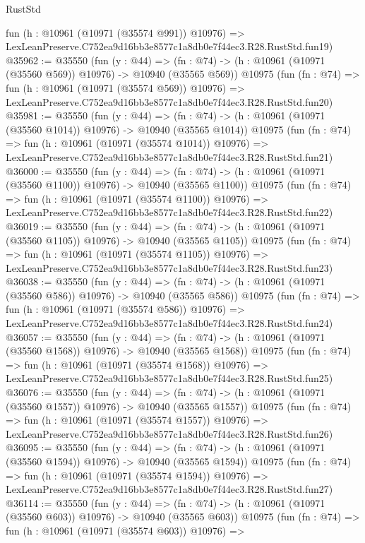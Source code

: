 \begin{lexlean}{RustStd}
\begin{coremodule}
    fun (h : @10961 (@10971 (@35574 @991)) @10976) =>
    LexLeanPreserve.C752ea9d16bb3e8577c1a8db0e7f44ec3.R28.RustStd.fun19)
@35962 := @35550
    (fun (y : @44) =>
    (fn : @74) -> (h : @10961 (@10971 (@35560 @569)) @10976) -> @10940 (@35565 @569))
    @10975
    (fun (fn : @74) =>
    fun (h : @10961 (@10971 (@35574 @569)) @10976) =>
    LexLeanPreserve.C752ea9d16bb3e8577c1a8db0e7f44ec3.R28.RustStd.fun20)
@35981 := @35550
    (fun (y : @44) =>
    (fn : @74) -> (h : @10961 (@10971 (@35560 @1014)) @10976) -> @10940 (@35565 @1014))
    @10975
    (fun (fn : @74) =>
    fun (h : @10961 (@10971 (@35574 @1014)) @10976) =>
    LexLeanPreserve.C752ea9d16bb3e8577c1a8db0e7f44ec3.R28.RustStd.fun21)
@36000 := @35550
    (fun (y : @44) =>
    (fn : @74) -> (h : @10961 (@10971 (@35560 @1100)) @10976) -> @10940 (@35565 @1100))
    @10975
    (fun (fn : @74) =>
    fun (h : @10961 (@10971 (@35574 @1100)) @10976) =>
    LexLeanPreserve.C752ea9d16bb3e8577c1a8db0e7f44ec3.R28.RustStd.fun22)
@36019 := @35550
    (fun (y : @44) =>
    (fn : @74) -> (h : @10961 (@10971 (@35560 @1105)) @10976) -> @10940 (@35565 @1105))
    @10975
    (fun (fn : @74) =>
    fun (h : @10961 (@10971 (@35574 @1105)) @10976) =>
    LexLeanPreserve.C752ea9d16bb3e8577c1a8db0e7f44ec3.R28.RustStd.fun23)
@36038 := @35550
    (fun (y : @44) =>
    (fn : @74) -> (h : @10961 (@10971 (@35560 @586)) @10976) -> @10940 (@35565 @586))
    @10975
    (fun (fn : @74) =>
    fun (h : @10961 (@10971 (@35574 @586)) @10976) =>
    LexLeanPreserve.C752ea9d16bb3e8577c1a8db0e7f44ec3.R28.RustStd.fun24)
@36057 := @35550
    (fun (y : @44) =>
    (fn : @74) -> (h : @10961 (@10971 (@35560 @1568)) @10976) -> @10940 (@35565 @1568))
    @10975
    (fun (fn : @74) =>
    fun (h : @10961 (@10971 (@35574 @1568)) @10976) =>
    LexLeanPreserve.C752ea9d16bb3e8577c1a8db0e7f44ec3.R28.RustStd.fun25)
@36076 := @35550
    (fun (y : @44) =>
    (fn : @74) -> (h : @10961 (@10971 (@35560 @1557)) @10976) -> @10940 (@35565 @1557))
    @10975
    (fun (fn : @74) =>
    fun (h : @10961 (@10971 (@35574 @1557)) @10976) =>
    LexLeanPreserve.C752ea9d16bb3e8577c1a8db0e7f44ec3.R28.RustStd.fun26)
@36095 := @35550
    (fun (y : @44) =>
    (fn : @74) -> (h : @10961 (@10971 (@35560 @1594)) @10976) -> @10940 (@35565 @1594))
    @10975
    (fun (fn : @74) =>
    fun (h : @10961 (@10971 (@35574 @1594)) @10976) =>
    LexLeanPreserve.C752ea9d16bb3e8577c1a8db0e7f44ec3.R28.RustStd.fun27)
@36114 := @35550
    (fun (y : @44) =>
    (fn : @74) -> (h : @10961 (@10971 (@35560 @603)) @10976) -> @10940 (@35565 @603))
    @10975
    (fun (fn : @74) =>
    fun (h : @10961 (@10971 (@35574 @603)) @10976) =>

\end{coremodule}
\end{lexlean}
